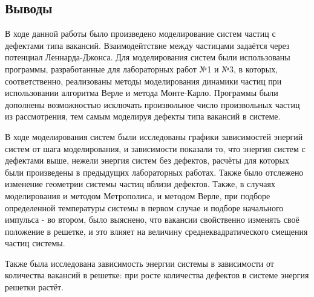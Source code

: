 \documentclass[14pt,a4paper,report]{ncc}
\begin{document}
\subsection{Выводы}
В ходе данной работы было произведено моделирование систем частиц с дефектами типа вакансий. Взаимодейтствие между частицами задаётся через потенциал Леннарда-Джонса. Для моделирования систем были использованы программы, разработанные для лабораторных работ №1 и №3, в которых, соответственно, реализованы методы моделирования динамики частиц при использовании алгоритма Верле и метода Монте-Карло. Программы были дополнены возможностью исключать произвольное число произвольных частиц из рассмотрения, тем самым моделируя дефекты типа вакансий в системе. 
\

В ходе моделирования систем были исследованы графики зависимостей энергий систем от шага моделирования, и зависимости показали то, что энергия систем с дефектами выше, нежели энергия систем без дефектов, расчёты для которых были произведены в предыдущих лабораторных работах. Также было отслежено изменение геометрии системы частиц вблизи дефектов. Также, в случаях моделирования и методом Метрополиса, и методом Верле, при подборе определенной температуры системы в первом случае и подборе начального импульса - во втором, было выяснено, что вакансии свойственно изменять своё положение в решетке, и это влияет на величину среднеквадратического смещения частиц системы.
\

Также была исследована зависимость энергии системы в зависимости от количества вакансий в решетке: при росте количества дефектов в системе энергия решетки растёт.
\end{document}
